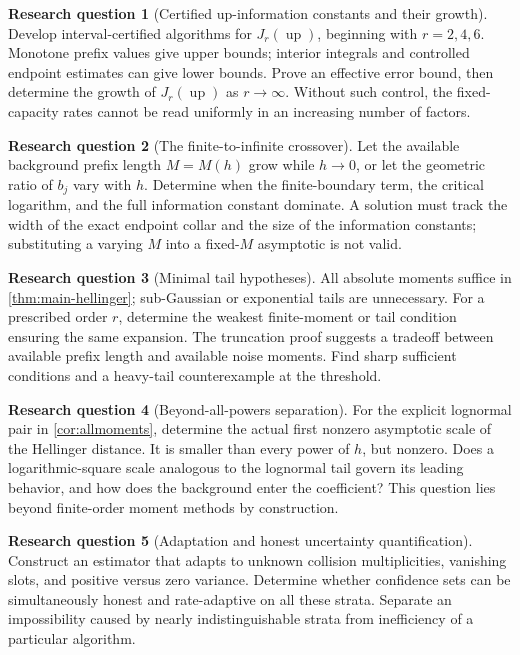\documentclass[11pt,a4paper]{article}
\numberwithin{equation}{section}
\theoremstyle{definition}
\newtheorem{question}{Research question}
\theoremstyle{remark}
\newcommand{\up}{\operatorname{up}}
\begin{document}
\begin{question}[Certified up-information constants and their growth]
Develop interval-certified algorithms for $J_r(\up)$, beginning with
$r=2,4,6$. Monotone prefix values give upper bounds; interior integrals and
controlled endpoint estimates can give lower bounds. Prove an effective
error bound, then determine the growth of $J_r(\up)$ as $r\to\infty$.
Without such control, the fixed-capacity rates cannot be read uniformly in
an increasing number of factors.
\end{question}

\begin{question}[The finite-to-infinite crossover]
Let the available background prefix length $M=M(h)$ grow while $h\to0$,
or let the geometric ratio of $b_j$ vary with $h$. Determine when the
finite-boundary term, the critical logarithm, and the full information
constant dominate. A solution must track the width of the exact endpoint
collar and the size of the information constants; substituting a varying
$M$ into a fixed-$M$ asymptotic is not valid.
\end{question}

\begin{question}[Minimal tail hypotheses]
All absolute moments suffice in \cref{thm:main-hellinger}; sub-Gaussian
or exponential tails are unnecessary. For a prescribed order $r$, determine
the weakest finite-moment or tail condition ensuring the same expansion.
The truncation proof suggests a tradeoff between available prefix length
and available noise moments. Find sharp sufficient conditions and a
heavy-tail counterexample at the threshold.
\end{question}

\begin{question}[Beyond-all-powers separation]
For the explicit lognormal pair in \cref{cor:allmoments}, determine the
actual first nonzero asymptotic scale of the Hellinger distance. It is
smaller than every power of $h$, but nonzero. Does a logarithmic-square
scale analogous to the lognormal tail govern its leading behavior, and
how does the background enter the coefficient? This question lies beyond
finite-order moment methods by construction.
\end{question}

\begin{question}[Adaptation and honest uncertainty quantification]
Construct an estimator that adapts to unknown collision multiplicities,
vanishing slots, and positive versus zero variance. Determine whether
confidence sets can be simultaneously honest and rate-adaptive on all
these strata. Separate an impossibility caused by nearly indistinguishable
strata from inefficiency of a particular algorithm.
\end{question}
\end{document}
